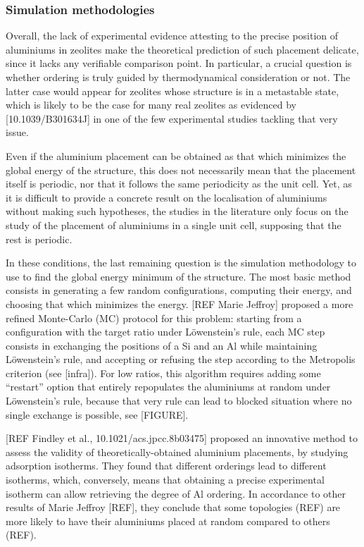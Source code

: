 \documentclass[main.tex]{subfiles}
\begin{document}
\subsubsection{Simulation methodologies}

Overall, the lack of experimental evidence attesting to the precise position of aluminiums in zeolites make the theoretical prediction of such placement delicate, since it lacks any verifiable comparison point. In particular, a crucial question is whether \SiAl ordering is truly guided by thermodynamical consideration or not. The latter case would appear for zeolites whose structure is in a metastable state, which is likely to be the case for many real zeolites as evidenced by [10.1039/B301634J] in one of the few experimental studies tackling that very issue.

Even if the aluminium placement can be obtained as that which minimizes the global energy of the structure, this does not necessarily mean that the placement itself is periodic, nor that it follows the same periodicity as the unit cell. Yet, as it is difficult to provide a concrete result on the localisation of aluminiums without making such hypotheses, the studies in the literature only focus on the study of the placement of aluminiums in a single unit cell, supposing that the rest is periodic.

In these conditions, the last remaining question is the simulation methodology to use to find the global energy minimum of the structure. The most basic method consists in generating a few random configurations, computing their energy, and choosing that which minimizes the energy. [REF Marie Jeffroy]\label{mariejeffroy_al} proposed a more refined Monte-Carlo (MC) protocol for this problem: starting from a configuration with the target \SiAl ratio under L\"owenstein's rule, each MC step consists in exchanging the positions of a Si and an Al while maintaining L\"owenstein's rule, and accepting or refusing the step according to the Metropolis criterion (see [infra]). For low \SiAl ratios, this algorithm requires adding some ``restart'' option that entirely repopulates the aluminiums at random under L\"owenstein's rule, because that very rule can lead to blocked situation where no single \SiAl exchange is possible, see [FIGURE].

[REF Findley et al., 10.1021/acs.jpcc.8b03475] proposed an innovative method to assess the validity of theoretically-obtained aluminium placements, by studying  adsorption isotherms. They found that different \SiAl orderings lead to different isotherms, which, conversely, means that obtaining a precise experimental isotherm can allow retrieving the degree of Al ordering. In accordance to other results of Marie Jeffroy [REF], they conclude that some topologies (REF) are more likely to have their aluminiums placed at random compared to others (REF).
\end{document}
